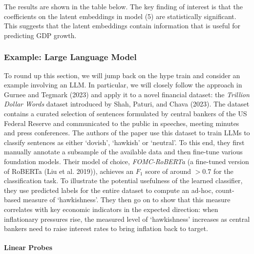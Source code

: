 \documentclass[
  letterpaper,
  DIV=11,
  numbers=noendperiod]{scrartcl}
\let\oldparagraph\paragraph
\renewcommand{\paragraph}[1]{\oldparagraph{#1}\mbox{}}
\theoremstyle{plain}
\theoremstyle{remark}
\begin{document}
The results are shown in the table below. The key finding of interest is
that the coefficients on the latent embeddings in model (5) are
statistically significant. This suggests that the latent embeddings
contain information that is useful for predicting GDP growth.



\subsubsection{Example: Large Language Model}\label{ex-llm}

To round up this section, we will jump back on the hype train and
consider an example involving an LLM. In particular, we will closely
follow the approach in Gurnee and Tegmark (2023) and apply it to a novel
financial dataset: the \emph{Trillion Dollar Words} dataset introduced
by Shah, Paturi, and Chava (2023). The dataset contains a curated
selection of sentences formulated by central bankers of the US Federal
Reserve and communicated to the public in speeches, meeting minutes and
press conferences. The authors of the paper use this dataset to train
LLMs to classify sentences as either `dovish', `hawkish' or `neutral'.
To this end, they first manually annotate a subsample of the available
data and then fine-tune various foundation models. Their model of
choice, \emph{FOMC-RoBERTa} (a fine-tuned version of RoBERTa (Liu et al.
2019)), achieves an \(F_1\) score of around \(>0.7\) for the
classification task. To illustrate the potential usefulness of the
learned classifier, they use predicted labels for the entire dataset to
compute an ad-hoc, count-based measure of `hawkishness'. They then go on
to show that this measure correlates with key economic indicators in the
expected direction: when inflationary pressures rise, the measured level
of `hawkishness' increases as central bankers need to raise interest
rates to bring inflation back to target.

\paragraph{Linear Probes}\label{linear-probes}
\end{document}
